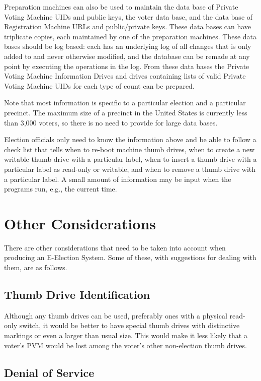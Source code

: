 \documentclass[12pt]{article}
\begin{document}
Preparation machines can also
be used to maintain the data base of Private Voting Machine
UIDs and public keys,
the voter data base, and the data base of
Registration Machine URLs and public/private keys.
These data bases can have triplicate copies, each maintained
by one of the preparation machines.  These data bases should
be log based: each has an underlying log of all changes
that is only added to and never otherwise modified,
and the database can be remade at any point by executing the
operations in the log.  From these data bases the Private
Voting Machine Information Drives and drives
containing lists of valid Private Voting Machine UIDs
for each type of count can be prepared.

Note that most information is specific to a particular election
and a particular precinct.  The maximum size of a precinct in
the United States is currently less than 3,000 voters, so there
is no need to provide for large data bases.

Election officials only need to know the information above
and be able to follow a check list that tells
when to re-boot machine thumb drives,
when to create a new writable thumb drive with a particular
label,
when to insert a thumb drive with a particular label
as read-only or writable, and
when to remove a thumb drive with a particular label.
A small amount of information may be input when the programs run,
e.g., the current time.


\section{Other Considerations}

There are other considerations that need to be taken into
account when producing an E-Election System.  Some of these,
with suggestions for dealing with them, are as follows.

\subsection{Thumb Drive Identification}

Although any thumb drives can be used, preferably ones with
a physical read-only switch, it would be better to
have special thumb drives with distinctive markings or even
a larger than usual size.  This would make it less likely
that a voter's PVM would be lost
among the voter's other non-election thumb drives.

\subsection{Denial of Service}
\end{document}
